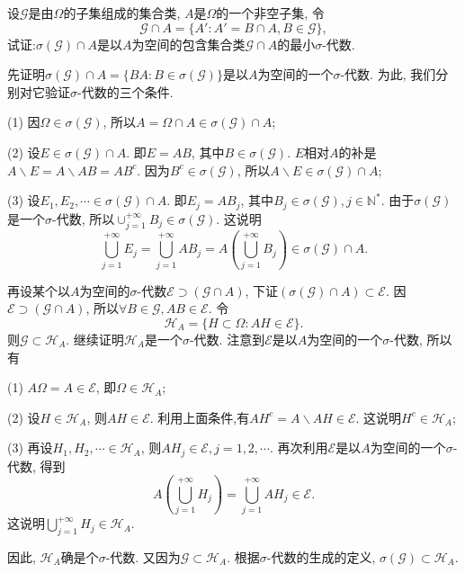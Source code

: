 \begin{yyEx}
	设$\mathscr{G}$是由$\Omega$的子集组成的集合类, $A$是$\Omega$的一个非空子集, 令\begin{equation}
	\mathscr{G}\cap A = \{ A':A'=B\cap A, B\in\mathscr{G} \},
	\end{equation}
	试证:$\sigma(\mathscr{G})\cap A$是以$A$为空间的包含集合类$\mathscr{G}\cap A$的最小$\sigma$-代数.
\end{yyEx}
	\begin{yyProof}
	先证明$\sigma(\mathscr{G})\cap A = \{BA: B\in \sigma(\mathscr{G})\}$是以$A$为空间的一个$\sigma$-代数. 
	为此, 我们分别对它验证$\sigma$-代数的三个条件.
	\begin{blist}
		\item[(1)] 因$\Omega\in\sigma(\mathscr{G})$, 所以$A = \Omega\cap A\in \sigma(\mathscr{G})\cap A$;
		\item[(2)] 设$E\in \sigma(\mathscr{G})\cap A$. 即$E = AB$, 其中$B\in\sigma(\mathscr{G})$.
		$E$相对$A$的补是$A\backslash E = A\backslash AB = AB^c$. 因为$B^c\in\sigma(\mathscr{G})$, 所以$A\backslash E\in \sigma(\mathscr{G})\cap A$;
		\item[(3)] 设$E_1,E_2,\cdots \in \sigma(\mathscr{G})\cap A$. 即$E_j = AB_j$, 其中$B_j\in\sigma(\mathscr{G}),j \in\mathbb{N}^*$. 由于$\sigma(\mathscr{G})$是一个$\sigma$-代数, 所以$\cup_{j=1}^{+\infty}B_j\in\sigma(\mathscr{G})$. 这说明
		\begin{equation}
		\bigcup_{j = 1}^{+\infty}E_j = \bigcup_{j = 1}^{+\infty}AB_j  =A\left(\bigcup_{j = 1}^{+\infty}B_j \right)\in \sigma(\mathscr{G})\cap A.
		\end{equation}
	\end{blist}
	再设某个以$A$为空间的$\sigma$-代数$\mathscr{E}\supset (\mathscr{G}\cap A)$, 下证$ \left(\sigma(\mathscr{G})\cap A\right)\subset \mathscr{E}$.
	因$\mathscr{E}\supset (\mathscr{G}\cap A)$, 所以$\forall B\in\mathscr{G}, AB\in\mathscr{E}$.
	令\begin{equation}
	\mathscr{H}_A = \{H\subset\Omega:AH\in\mathscr{E}\}.
	\end{equation}
	则$\mathscr{G}\subset\mathscr{H}_A$. 继续证明$\mathscr{H}_A$是一个$\sigma$-代数.
	注意到$\mathscr{E}$是以$A$为空间的一个$\sigma$-代数, 所以有
	\begin{blist}
		\item[(1)] $A\Omega =A\in\mathscr{E}$, 即$\Omega\in \mathscr{H}_A$;
		\item[(2)] 设$H\in \mathscr{H}_A$, 则$AH\in\mathscr{E}$. 利用上面条件,有$AH^c = A\backslash AH\in\mathscr{E}$. 这说明$H^c\in \mathscr{H}_A$;
		\item[(3)] 再设$H_1,H_2,\cdots\in \mathscr{H}_A$, 则$AH_j\in\mathscr{E},j=1,2,\cdots$. 再次利用$\mathscr{E}$是以$A$为空间的一个$\sigma$-代数, 得到\begin{equation}
		A\left(\bigcup_{j=1}^{+\infty}H_j\right) = \bigcup_{j=1}^{+\infty}AH_j\in \mathscr{E}.
		\end{equation}
		这说明$\bigcup_{j=1}^{+\infty}H_j\in \mathscr{H}_A$.
	\end{blist}
	因此, $\mathscr{H}_A$确是个$\sigma$-代数. 又因为$\mathscr{G}\subset\mathscr{H}_A$. 根据$\sigma$-代数的生成的定义, $\sigma(\mathscr{G})\subset \mathscr{H}_A$.
	

\end{yyProof}
